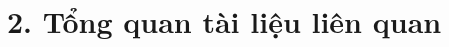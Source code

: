 \documentclass[../main.tex]{subfiles}
\begin{document}
\section{2. Tổng quan tài liệu liên quan}

\end{document}
